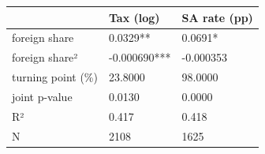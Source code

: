 \begin{tabular}{lll}
\toprule
 & Tax (log) & SA rate (pp) \\
\midrule
foreign share & 0.0329** & 0.0691* \\
foreign share² & -0.000690*** & -0.000353 \\
turning point (\%) & 23.8000 & 98.0000 \\
joint p-value & 0.0130 & 0.0000 \\
R² & 0.417 & 0.418 \\
N & 2108 & 1625 \\
\bottomrule
\end{tabular}
